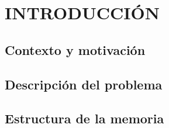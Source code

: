 \chapter{INTRODUCCIÓN}


\section{Contexto y motivación}


\section{Descripción del problema}


\section{Estructura de la memoria}

